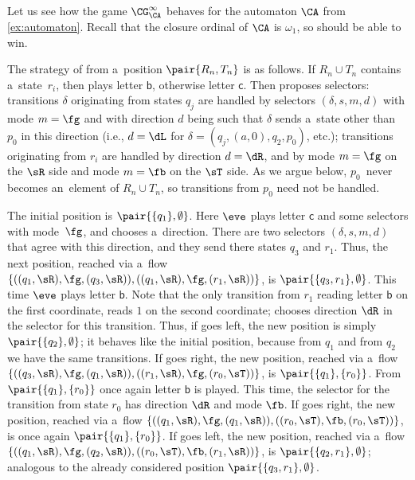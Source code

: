 \documentclass{lmcs}
\numberwithin{equation}{section}
\numberwithin{figure}{section}
\begin{document}
\begin{exa}
	Let us see how the game $\CG^\infty_\CA$ behaves for the automaton $\CA$ from \cref{ex:automaton}.
	Recall that the closure ordinal of $\CA$ is $\omega_1$, so \eve should be able to win.
	
	The strategy of \eve from a~position $\pair{R_n,T_n}$ is as follows.
	If $R_n\cup T_n$ contains a~state~$r_i$, then \eve plays letter $\mathsf{b}$, otherwise letter $\mathsf{c}$.
	Then \eve proposes selectors:
	transitions $\delta$ originating from states $q_j$ are handled by selectors $(\delta,s,m,d)$ with mode $m=\fg$
	and with direction $d$ being such that $\delta$ sends a~state other than $p_0$ in this direction (i.e., $d=\dL$ for $\delta=(q_j,(a,0),q_2,p_0)$, etc.);
	transitions originating from $r_i$ are handled by direction $d=\dR$, and by mode $m=\fg$ on the $\sR$ side and mode $m=\fb$ on the $\sT$ side.
	As we argue below, $p_0$~never becomes an~element of $R_n\cup T_n$, so transitions from $p_0$ need not be handled.
	
	The initial position is $\pair{\{q_1\},\emptyset}$.
	Here $\eve$ plays letter $\mathsf{c}$ and some selectors with mode~$\fg$, and \adam chooses a~direction.
	There are two selectors $(\delta,s,m,d)$ that agree with this direction, and they send there states $q_3$ and $r_1$.
	Thus, the next position, reached via a~flow $\{((q_1,\sR),\fg,(q_3,\sR)),((q_1,\sR),\fg,(r_1,\sR))\}$, is $\pair{\{q_3,r_1\},\emptyset}$.
	This time $\eve$ plays letter $\mathsf{b}$.
	Note that the only transition from $r_1$ reading letter $\mathsf{b}$ on the first coordinate, reads $1$ on the second coordinate; \eve chooses direction $\dR$ in the selector for this transition.
	Thus, if \adam goes left, the new position is simply $\pair{\{q_2\},\emptyset}$; it behaves like the initial position, because from $q_1$ and from $q_2$ we have the same transitions.
	If \adam goes right, the new position, reached via a~flow $\{((q_3,\sR),\fg,(q_1,\sR)),((r_1,\sR),\fg,(r_0,\sT))\}$, is $\pair{\{q_1\},\{r_0\}}$.
	From $\pair{\{q_1\},\{r_0\}}$ once again letter $\mathsf{b}$ is played.
	This time, the selector for the transition from state $r_0$ has direction $\dR$ and mode $\fb$.
	If \adam goes right, the new position, reached via a~flow $\{((q_1,\sR),\fg,(q_1,\sR)),((r_0,\sT),\fb,(r_0,\sT))\}$, is once again $\pair{\{q_1\},\{r_0\}}$.
	If \adam goes left, the new position, reached via a~flow $\{((q_1,\sR),\fg,(q_2,\sR)),((r_0,\sT),\fb,(r_1,\sR))\}$, is $\pair{\{q_2,r_1\},\emptyset}$;
	analogous to the already considered position $\pair{\{q_3,r_1\},\emptyset}$.


\end{exa}
\end{document}
